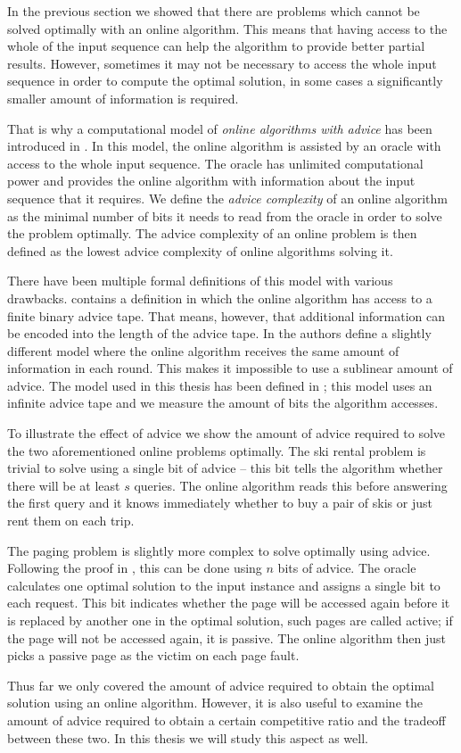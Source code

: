 In the previous section we showed that there are problems which cannot be
solved optimally with an online algorithm. This means that having access
to the whole of the input sequence can help the algorithm to provide
better partial results. However, sometimes it may not be necessary to
access the whole input sequence in order to compute the optimal solution,
in some cases a significantly smaller amount of information is required.

That is why a computational model of \emph{online algorithms with advice}
has been introduced in \cite{advice-first}. In this model, the online
algorithm is assisted by an oracle with access to the whole input
sequence. The oracle has unlimited computational power and provides the
online algorithm with information about the input sequence that it
requires. We define the \emph{advice complexity} of an online algorithm as
the minimal number of bits it needs to read from the oracle in order to
solve the problem optimally. The advice complexity of an online problem is
then defined as the lowest advice complexity of online algorithms solving
it.

There have been multiple formal definitions of this model with various
drawbacks. \cite{advice-first} contains a definition in which the online
algorithm has access to a finite binary advice tape. That means, however,
that additional information can be encoded into the length of the advice
tape. In \cite{advice-constant} the authors define a slightly different
model where the online algorithm receives the same amount of information
in each round. This makes it impossible to use a sublinear amount of
advice. The model used in this thesis has been defined in
\cite{advice-infinite}; this model uses an infinite advice tape and we
measure the amount of bits the algorithm accesses.

To illustrate the effect of advice we show the amount of advice required
to solve the two aforementioned online problems optimally. The ski rental
problem is trivial to solve using a single bit of advice -- this bit tells
the algorithm whether there will be at least $s$ queries. The online
algorithm reads this before answering the first query and it knows
immediately whether to buy a pair of skis or just rent them on each trip.

The paging problem is slightly more complex to solve optimally using
advice. Following the proof in \cite{paging-optimal}, this can be done
using $n$ bits of advice. The oracle calculates one optimal solution to
the input instance and assigns a single bit to each request. This bit
indicates whether the page will be accessed again before it is replaced by
another one in the optimal solution, such pages are called active; if the
page will not be accessed again, it is passive. The online algorithm then
just picks a passive page as the victim on each page fault.

Thus far we only covered the amount of advice required to obtain the
optimal solution using an online algorithm. However, it is also useful to
examine the amount of advice required to obtain a certain competitive
ratio and the tradeoff between these two. In this thesis we will study
this aspect as well.
